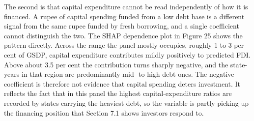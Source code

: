 \documentclass[12pt,a4paper]{article}
\begin{document}
The second is that capital expenditure cannot be read independently of how it is financed. A rupee of capital spending funded from a low debt base is a different signal from the same rupee funded by fresh borrowing, and a single coefficient cannot distinguish the two. The SHAP dependence plot in Figure 25 shows the pattern directly. Across the range the panel mostly occupies, roughly 1 to 3 per cent of GSDP, capital expenditure contributes mildly positively to predicted FDI. Above about 3.5 per cent the contribution turns sharply negative, and the state-years in that region are predominantly mid- to high-debt ones. The negative coefficient is therefore not evidence that capital spending deters investment. It reflects the fact that in this panel the highest capital-expenditure ratios are recorded by states carrying the heaviest debt, so the variable is partly picking up the financing position that Section 7.1 shows investors respond to.
\end{document}
